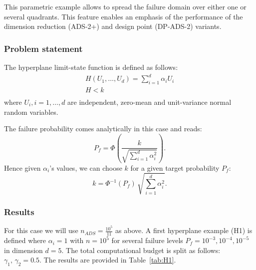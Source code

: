 This parametric example allows to spread the failure domain over either one or several quadrants. This feature enables an emphasis of the performance of the dimension reduction (ADS-2+) and design point (DP-ADS-2) variants.\par

\subsubsection{Problem statement}

The hyperplane limit-state function is defined as follows:
\begin{eqnarray*}
  H(U_1, \dots, U_d) = \sum\limits_{i=1}^d \alpha_i U_i\\
  H < k\\
\end{eqnarray*}
where $U_i, i = 1, \ldots, d$ are independent, zero-mean and unit-variance normal random variables.\par

The failure probability comes analytically in this case and reads:
\begin{equation*}
    P_f = \Phi\left(\frac{k}{\sqrt{\sum\limits_{i=1}^d \alpha_i^2}}\right).
\end{equation*}
Hence given $\alpha_i$'s values, we can choose $k$ for a given target probability $P_f$:
\begin{equation*}
    k = \Phi^{-1}(P_f)\,\sqrt{\sum\limits_{i=1}^d \alpha_i^2}.
\end{equation*}

\subsubsection{Results}

For this case we will use $n_{ADS}=\frac{10^5}{11}$ as above. A first hyperplane example (H1) is defined where $\alpha_i = 1$ with $n = 10^5$ for several failure levels $P_f = 10^{-3}, 10^{-4}, 10^{-5}$ in dimension $d = 5$. The total computational budget is split as follows: $\gamma_1,\,\gamma_2 = 0.5$. The results are provided in Table~\ref{tab:H1}.\par

